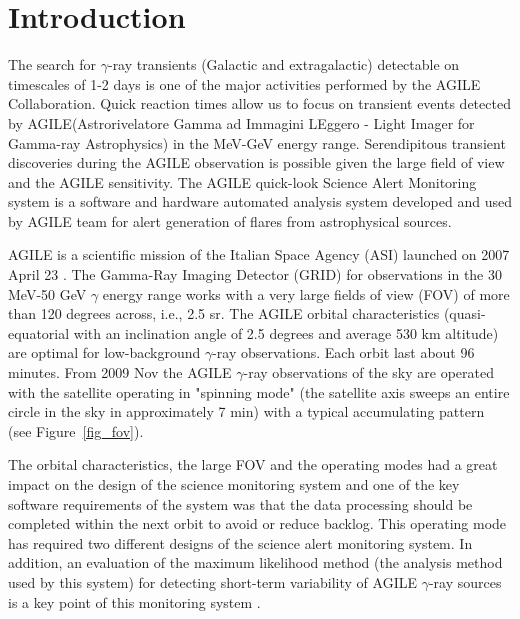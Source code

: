 \section{Introduction}
The search for $\gamma$-ray transients (Galactic and extragalactic) detectable on timescales of 1-2 days is one of the major activities performed by the AGILE Collaboration. Quick reaction times allow us to focus on transient events detected by AGILE(Astrorivelatore Gamma ad Immagini LEggero - Light Imager for Gamma-ray Astrophysics) in the MeV-GeV energy range. Serendipitous transient discoveries during the AGILE observation is possible given the large field of view and the AGILE sensitivity. The AGILE quick-look Science Alert Monitoring system  is a software and hardware automated analysis system developed and used by AGILE team for alert generation of flares from astrophysical sources.

AGILE is a scientific mission of the Italian Space Agency (ASI) launched on 2007 April 23 \citep{Tavani:2009ht}. The Gamma-Ray Imaging Detector (GRID) for observations in the 30 MeV-50 GeV $\gamma$ energy range works with a very large fields of view (FOV) of more than 120 degrees across, i.e., 2.5 sr. The AGILE orbital characteristics (quasi-equatorial with an inclination angle of 2.5 degrees and average 530 km altitude) are optimal for low-background  $\gamma$-ray observations. Each orbit last about 96 minutes. From 2009 Nov the AGILE $\gamma$-ray observations of the sky are operated  with the satellite operating in "spinning mode" (the satellite axis sweeps an entire circle in the sky in approximately 7 min) with a typical accumulating pattern (see Figure~\ref{fig_fov}).            

The orbital characteristics, the large FOV and the operating modes had a great impact on the design of the science monitoring system and one of the key software requirements of the system was that the data processing should be completed within the next orbit to avoid or reduce backlog. This operating mode has required two different designs of the science alert monitoring system. In addition, an evaluation of the maximum likelihood method (the analysis method used by this system) for detecting short-term variability of AGILE $\gamma$-ray sources is a key point of this monitoring system \citep{Bulgarelli:2012ds}.
                   
